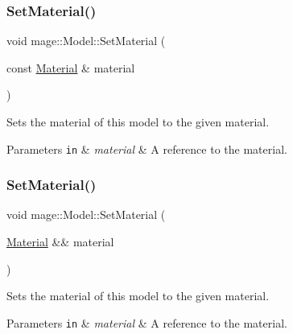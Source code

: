 \subsubsection{\texorpdfstring{Set\+Material()}{SetMaterial()}\hspace{0.1cm}{\footnotesize\ttfamily [1/2]}}
{\footnotesize\ttfamily void mage\+::\+Model\+::\+Set\+Material (\begin{DoxyParamCaption}\item[{const \hyperlink{classmage_1_1_material}{Material} \&}]{material }\end{DoxyParamCaption})\hspace{0.3cm}{\ttfamily [noexcept]}}

Sets the material of this model to the given material.


\begin{DoxyParams}[1]{Parameters}
\mbox{\tt in}  & {\em material} & A reference to the material. \\
\hline
\end{DoxyParams}
\hypertarget{classmage_1_1_model_a19f6c35097f95d8d41497cc596e18bc5}{}\label{classmage_1_1_model_a19f6c35097f95d8d41497cc596e18bc5} 
\subsubsection{\texorpdfstring{Set\+Material()}{SetMaterial()}\hspace{0.1cm}{\footnotesize\ttfamily [2/2]}}
{\footnotesize\ttfamily void mage\+::\+Model\+::\+Set\+Material (\begin{DoxyParamCaption}\item[{\hyperlink{classmage_1_1_material}{Material} \&\&}]{material }\end{DoxyParamCaption})\hspace{0.3cm}{\ttfamily [noexcept]}}

Sets the material of this model to the given material.


\begin{DoxyParams}[1]{Parameters}
\mbox{\tt in}  & {\em material} & A reference to the material. \\
\hline
\end{DoxyParams}
\hypertarget{classmage_1_1_model_a68168e66cb04c08f27616e9d7768a99e}{}\label{classmage_1_1_model_a68168e66cb04c08f27616e9d7768a99e} 
